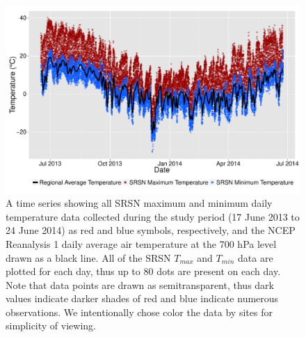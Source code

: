 \documentclass{ametsoc}
\begin{document}
\begin{figure}[ht]

\centerline{\includegraphics[width=39pc]{figure04_raw-t-data.pdf}}

 \caption{A time series showing all SRSN maximum and minimum daily temperature data collected during the study period (17 June 2013 to 24 June 2014) as red and blue symbols, respectively, and the NCEP Reanalysis 1 daily average air temperature at the 700 hPa level drawn as a black line. All of the SRSN $T_{max}$ and $T_{min}$ data are plotted for each day, thus up to 80 dots are present on each day. Note that data points are drawn as semitransparent, thus dark values indicate darker shades of red and blue indicate numerous observations. We intentionally chose color the data by sites for simplicity of viewing.}\label{fig:4}

\end{figure}
\end{document}
